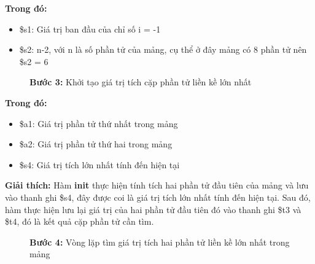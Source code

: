 \documentclass[a4paper,12pt]{article}
\begin{document}
\noindent
\textbf{Trong đó: }
\begin{itemize}
    \item \$s1: Giá trị ban đầu của chỉ số i = -1
    \item \$s2: n-2, với n là số phần tử của mảng, cụ thể ở đây mảng có 8 phần tử nên \$s2 = 6
\end{itemize}
\begin{figure}[!h]
	\centerline{}
	\caption*{\textbf{Bước 3:} Khởi tạo giá trị tích cặp phần tử liền kề lớn nhất}
	\label{fig:data6}
\end{figure}
\noindent
\textbf{Trong đó: }
\begin{itemize}
    \item \$a1:	Giá trị phần tử thứ nhất trong mảng	
    \item \$a2:	Giá trị phần tử thứ hai trong mảng
    \item \$s4: Giá trị tích lớn nhất tính đến hiện tại
\end{itemize}
\noindent
\textbf{Giải thích: }Hàm \textbf{init} thực hiện tính tích hai phần tử đầu tiên của mảng và lưu vào thanh ghi \$s4, đây được coi là giá trị tích lớn nhất tính đến hiện tại. Sau đó, hàm thực hiện lưu lại giá trị của hai phần tử đầu tiên đó vào thanh ghi \$t3 và \$t4, đó là kết quả cặp phần tử cần tìm.
\clearpage
\begin{figure}[!h]
	\centerline{}
	\caption*{\textbf{Bước 4:} Vòng lặp tìm giá trị tích hai phần tử liền kề lớn nhất trong mảng}
	\label{fig:data6}
\end{figure}
\end{document}
